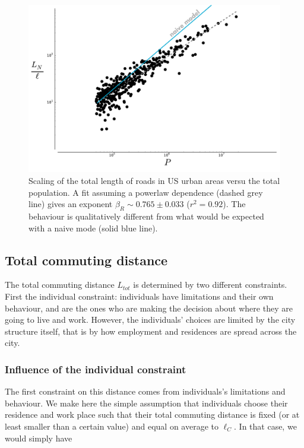 \begin{figure}
    \centering
    \includegraphics[width=\textwidth]{gfx/chapter-scaling/scaling_lanemiles.pdf}
    \caption{Scaling of the total length of roads in US urban areas versu the
    total population. A fit assuming a powerlaw dependence (dashed grey line)
gives an exponent $\beta_R \sim 0.765 \pm 0.033$ ($r^2=0.92$). The behaviour is
qualitatively different from what would be expected with a naive mode (solid
blue line).\label{fig:scaling_lanemiles}}
\end{figure}



\subsection{Total commuting distance}
\label{sec:total_length_driven}

The total commuting distance $L_{tot}$ is determined by two different
constraints. First the individual constraint: individuals have limitations and
their own behaviour, and are the ones who are making the decision about where
they are going to live and work.  However, the individuals' choices are limited
by the city structure itself, that is by how employment and residences are
spread across the city.



\subsubsection{Influence of the individual constraint} 

The first constraint on this distance comes from individuals's limitations and
behaviour. We make here the simple assumption that individuals choose their
residence and work place such that their total commuting distance is fixed (or
at least smaller than a certain value) and equal on average to $\ell_C$. In that
case, we would simply have

